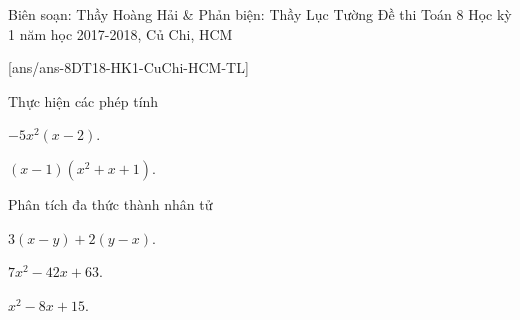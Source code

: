\begin{name}
{Biên soạn: Thầy Hoàng Hải \& Phản biện: Thầy Lục Tường}
{Đề thi Toán 8 Học kỳ 1 năm học 2017-2018, Củ Chi, HCM}
\end{name}
\setcounter{bt}{0}
[ans/ans-8DT18-HK1-CuChi-HCM-TL]

\begin{bt}%
Thực hiện các phép tính
\begin{enumEX}{2}
	\item $-5x^2(x-2)$.
	\item $(x-1)(x^2+x+1)$.
\end{enumEX}
\end{bt}

\begin{bt}%
Phân tích đa thức thành nhân tử
\begin{enumEX}{3}
	\item $3(x-y)+2(y-x)$.
	\item $7x^2-42x+63$.
	\item $x^2-8x+15$.
\end{enumEX}
\end{bt}

